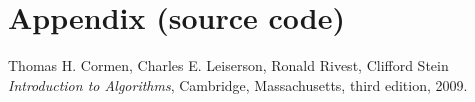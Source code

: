 \documentclass[a4paper,11pt]{article}
\begin{document}
\newpage

\section{Appendix (source code)}

%
%

\begin{thebibliography}{9}
	
	Thomas H. Cormen, Charles E. Leiserson, Ronald Rivest, Clifford Stein
	\emph{Introduction to Algorithms},
	Cambridge, Massachusetts,
	third edition,
	2009.
	
\end{thebibliography}
\end{document}

